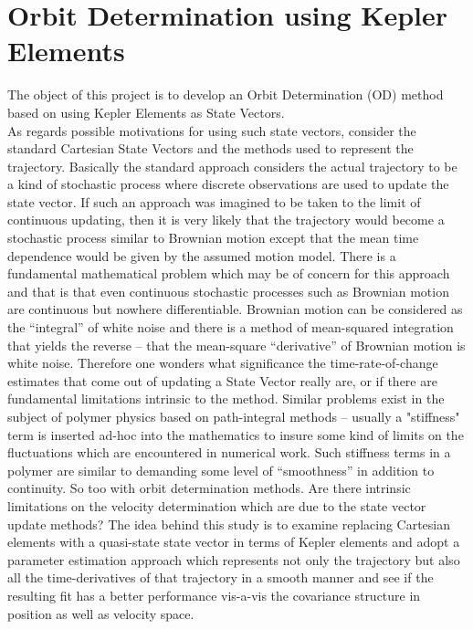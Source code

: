 \section{Orbit Determination using Kepler Elements}

The object of this project is to develop an Orbit Determination (OD) method based on using Kepler Elements as State Vectors.\\

As regards possible motivations for using such state vectors, consider the standard Cartesian State Vectors and the methods used to represent the trajectory. Basically the standard approach considers the actual trajectory to be a kind of stochastic process where discrete observations are used to update the state vector. If such an approach was imagined to be taken to the limit of continuous updating, then it is very likely that the trajectory would become a stochastic process similar to Brownian motion except that the mean time dependence would be given by the assumed motion model. There is a fundamental mathematical problem which may be of concern for this approach and that is that even continuous stochastic processes such as Brownian motion are continuous but nowhere differentiable. Brownian motion can be considered as the ``integral'' of white noise and there is a method of mean-squared integration that yields the reverse -- that the mean-square ``derivative'' of Brownian motion is white noise. Therefore one wonders what significance the time-rate-of-change estimates that come out of updating a State Vector really are, or if there are fundamental limitations intrinsic to the method. Similar problems exist in the subject of polymer physics based on path-integral methods -- usually a "stiffness" term is inserted ad-hoc into the mathematics to insure some kind of limits on the fluctuations which are encountered in numerical work. Such stiffness terms in a polymer are similar to demanding some level of ``smoothness'' in addition to continuity. So too with orbit determination methods. Are there intrinsic limitations on the velocity determination which are due to the state vector update methods? The idea behind this study is to examine replacing Cartesian elements with a quasi-state state vector in terms of Kepler elements and adopt a parameter estimation approach which represents not only the trajectory but also all the time-derivatives of that trajectory in a smooth manner and see if the resulting fit has a better performance vis-a-vis the covariance structure in position as well as velocity space.\\

